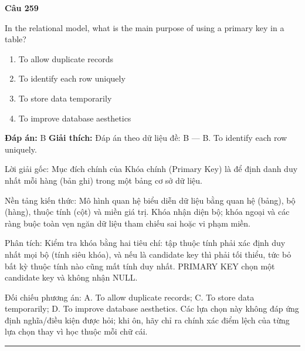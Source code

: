\documentclass[11pt,a4paper]{article}
\newenvironment{question}[1]{%
  \par\vspace{1em}\noindent\textbf{\large Câu #1}\par\vspace{0.4em}
}{%
  \par\vspace{1em}\hrule\vspace{0.6em}
}
\newenvironment{choices}{%
  \begin{enumerate}[label=\textbf{\Alph*.},leftmargin=2.2em,itemsep=2pt,topsep=3pt]
}{%
  \end{enumerate}
}
\newcommand{\choice}{\item}
\begin{document}
\begin{question}{259}
In the relational model, what is the main purpose of using a primary key in a table?
\begin{choices}
\choice To allow duplicate records
\choice To identify each row uniquely
\choice To store data temporarily
\choice To improve database aesthetics
\end{choices}
\textbf{Đáp án:} B
\textbf{Giải thích:} Đáp án theo dữ liệu đề: B — B. To identify each row uniquely.

Lời giải gốc: Mục đích chính của Khóa chính (Primary Key) là để định danh duy nhất mỗi hàng (bản ghi) trong một bảng cơ sở dữ liệu.

Nền tảng kiến thức: Mô hình quan hệ biểu diễn dữ liệu bằng quan hệ (bảng), bộ (hàng), thuộc tính (cột) và miền giá trị. Khóa nhận diện bộ; khóa ngoại và các ràng buộc toàn vẹn ngăn dữ liệu tham chiếu sai hoặc vi phạm miền.

Phân tích: Kiểm tra khóa bằng hai tiêu chí: tập thuộc tính phải xác định duy nhất mọi bộ (tính siêu khóa), và nếu là candidate key thì phải tối thiểu, tức bỏ bất kỳ thuộc tính nào cũng mất tính duy nhất. PRIMARY KEY chọn một candidate key và không nhận NULL.

Đối chiếu phương án: A. To allow duplicate records; C. To store data temporarily; D. To improve database aesthetics. Các lựa chọn này không đáp ứng định nghĩa/điều kiện được hỏi; khi ôn, hãy chỉ ra chính xác điểm lệch của từng lựa chọn thay vì học thuộc mỗi chữ cái.
\end{question}
\end{document}

